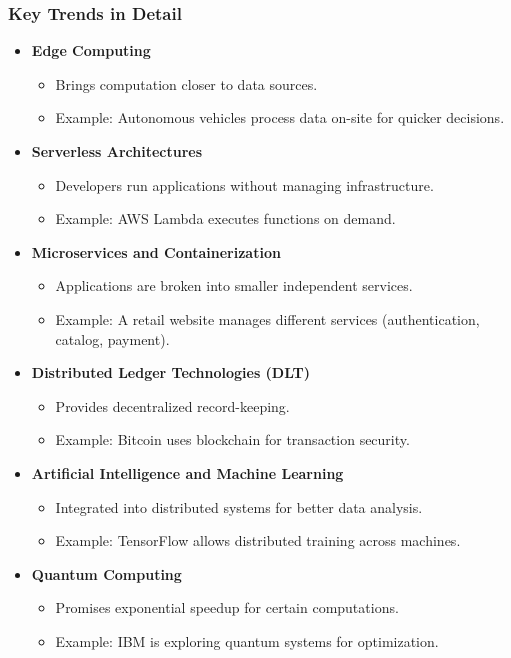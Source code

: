 \documentclass[aspectratio=169]{beamer}
\begin{document}
\begin{frame}[fragile]
  \frametitle{Key Trends in Detail}

  \begin{itemize}
    \item \textbf{Edge Computing}
      \begin{itemize}
        \item Brings computation closer to data sources.
        \item Example: Autonomous vehicles process data on-site for quicker decisions.
      \end{itemize}
    
    \item \textbf{Serverless Architectures}
      \begin{itemize}
        \item Developers run applications without managing infrastructure.
        \item Example: AWS Lambda executes functions on demand.
      \end{itemize}

    \item \textbf{Microservices and Containerization}
      \begin{itemize}
        \item Applications are broken into smaller independent services.
        \item Example: A retail website manages different services (authentication, catalog, payment).
      \end{itemize}
    
    \item \textbf{Distributed Ledger Technologies (DLT)}
      \begin{itemize}
        \item Provides decentralized record-keeping.
        \item Example: Bitcoin uses blockchain for transaction security.
      \end{itemize}
    
    \item \textbf{Artificial Intelligence and Machine Learning}
      \begin{itemize}
        \item Integrated into distributed systems for better data analysis.
        \item Example: TensorFlow allows distributed training across machines.
      \end{itemize}
    
    \item \textbf{Quantum Computing}
      \begin{itemize}
        \item Promises exponential speedup for certain computations.
        \item Example: IBM is exploring quantum systems for optimization.
      \end{itemize}
  \end{itemize}
\end{frame}
\end{document}
